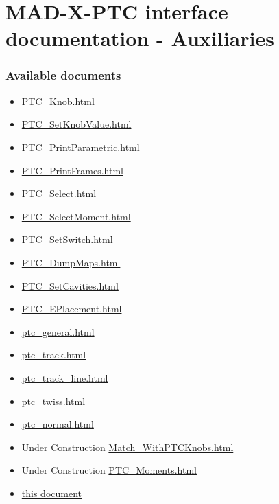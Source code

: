 


\section{MAD-X-PTC interface documentation - Auxiliaries}

\subsubsection{ Available documents }
\begin{itemize}
	\item \href{PTC_Knob.html}{ PTC\_Knob.html }
	\item \href{PTC_SetKnobValue.html}{ PTC\_SetKnobValue.html }
	\item \href{PTC_PrintParametric.html}{ PTC\_PrintParametric.html }
	\item \href{PTC_PrintFrames.html}{ PTC\_PrintFrames.html }
	\item \href{PTC_Select.html}{ PTC\_Select.html }
	\item \href{PTC_SelectMoment.html}{ PTC\_SelectMoment.html }
	\item \href{PTC_SetSwitch.html}{ PTC\_SetSwitch.html }
	\item \href{PTC_DumpMaps.html}{  PTC\_DumpMaps.html}
	\item \href{PTC_SetCavities.html}{ PTC\_SetCavities.html }
	\item \href{PTC_EPlacement.html}{ PTC\_EPlacement.html }
	\item \href{../ptc_general/ptc_general.html}{ ptc\_general.html }
	\item \href{../ptc_track/ptc_track.html}{ ptc\_track.html }
	\item \href{../ptc_track_line/ptc_track_line.html}{ ptc\_track\_line.html }
	\item \href{../ptc_twiss/ptc_twiss.html}{ ptc\_twiss.html }
	\item \href{../ptc_normal/ptc_normal.html}{ ptc\_normal.html }
	\item  Under Construction \href{Match_WithPTCKnobs.html}{ Match\_WithPTCKnobs.html }
	\item  Under Construction \href{PTC_Moments.html}{ PTC\_Moments.html }
	\item \href{ptc_auxiliaries.html}{ this document }
\end{itemize}

